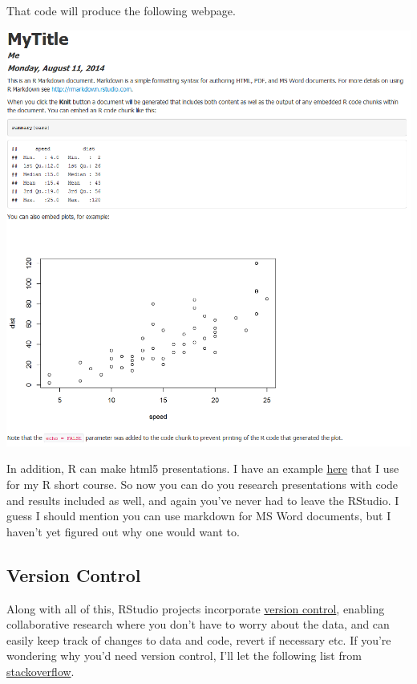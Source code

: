 \documentclass[english,nohyper,titlepage]{tufte-handout}\usepackage[]{graphicx}\usepackage[]{color}
\begin{document}
\bigskip
\noindent That code will produce the following webpage.
\bigskip

\includegraphics[scale=.25]{rmarkdown}

In addition, R can make html5 presentations.  I have an example \href{http://www3.nd.edu/~mclark19/learn/presentation/RI/#1}{here} that I use for my R short course.  So now you can do you research presentations with code and results included as well, and again you've never had to leave the RStudio.  I guess I should mention you can use markdown for MS Word documents, but I haven't yet figured out why one would want to.

\subsection{Version Control}
Along with all of this, RStudio projects incorporate \href{https://support.rstudio.com/hc/en-us/articles/200532077-Version-Control-with-Git-and-SVN}{version control}, enabling collaborative research where you don't have to worry about the data, and can easily keep track of changes to data and code, revert if necessary etc.  If you're wondering why you'd need version control, I'll let the following list from \href{http://stackoverflow.com/questions/1408450/why-should-i-use-version-control}{stackoverflow}.
\end{document}
